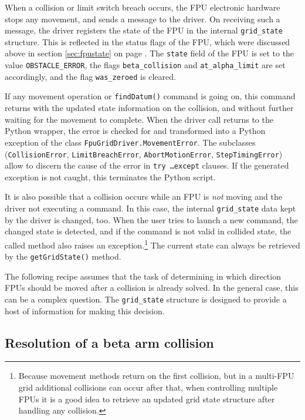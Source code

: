 \documentclass{scrartcl}[12pt,a4paper]
\begin{document}
When a collision or limit switch breach occurs, the FPU electronic
hardware stops any movement, and sends a message to the driver. On
receiving such a message, the driver registers the state of the FPU in
the internal \texttt{grid\_state} structure. This is reflected in the
status flags of the FPU, which were discussed above in section
\ref{sec:fpustate} on page \pageref{sec:fpustate}.  The \texttt{state}
field of the FPU is set to the value \texttt{OBSTACLE\_ERROR}, the
flags \texttt{beta\_collision} and \texttt{at\_alpha\_limit} are set
accordingly, and the flag \texttt{was\_zeroed} is cleared.

If any movement operation or \texttt{findDatum()} command is going on,
this command returns with the updated state information on the
collision, and without further waiting for the movement to complete.
When the driver call returns to the Python wrapper, the error is
checked for and transformed into a Python exception of the class
\texttt{FpuGridDriver.MovementError}. The subclasses
(\texttt{CollisionError}, \texttt{LimitBreachError},
\texttt{AbortMotionError}, \texttt{StepTimingError}) allow to discern
the cause of the error in \texttt{try \ldots except} clauses.  If the
generated exception is not caught, this terminates the Python script.

It is also possible that a collision occurs while an FPU is \emph{not}
moving and the driver not executing a command.  In this case, the
internal \texttt{grid\_state} data kept by the driver is changed,
too. When the user tries to launch a new command, the changed state is
detected, and if the command is not valid in collided state, the
called method also raises an exception.\footnote{Because movement
  methods return on the first collision, but in a multi-FPU grid
  additional collisions can occur after that, when controlling
  multiple FPUs it is a good idea to retrieve an updated grid state
  structure after handling any collision.} The current state can
always be retrieved by the \texttt{getGridState()} method.

The following recipe assumes that the task of determining in which
direction FPUs should be moved after a collision is already solved.
In the general case, this can be a complex question. The
\texttt{grid\_state} structure is designed to provide a host of
information for making this decision.

\subsection{Resolution of a beta arm collision}
\end{document}
